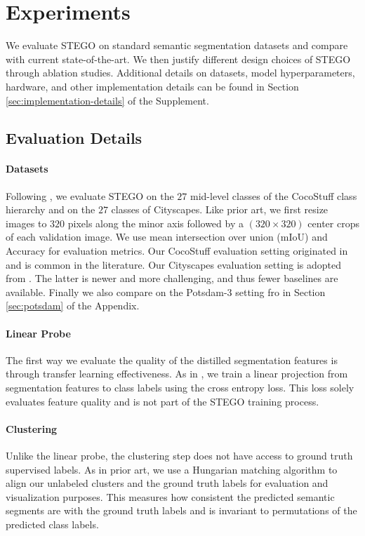 \documentclass{article} \usepackage{iclr2022_conference,times}
\begin{document}
\section{Experiments}
\vspace{-.1in}

We evaluate STEGO on standard semantic segmentation datasets and compare with current state-of-the-art. We then justify different design choices of STEGO through ablation studies. Additional details on datasets, model hyperparameters, hardware, and other implementation details can be found in Section \ref{sec:implementation-details} of the Supplement.

\subsection{Evaluation Details}
\label{sec:evaluation}
\vspace{-.1in}
\paragraph{Datasets}
Following \cite{Cho2021PiCIEUS}, we evaluate STEGO on the $27$ mid-level classes of the CocoStuff class hierarchy and on the $27$ classes of Cityscapes. Like prior art, we first resize images to $320$ pixels along the minor axis followed by a $(320 \times 320)$ center crops of each validation image. We use mean intersection over union (mIoU) and Accuracy for evaluation metrics. Our CocoStuff evaluation setting originated in \cite{iic} and is common in the literature. Our Cityscapes evaluation setting is adopted from \cite{Cho2021PiCIEUS}. The latter is newer and more challenging, and thus fewer baselines are available. Finally we also compare on the Potsdam-3 setting fro \cite{iic} in Section \ref{sec:potsdam} of the Appendix.
\vspace{-.1in}
\paragraph{Linear Probe} The first way we evaluate the quality of the distilled segmentation features is through transfer learning effectiveness. As in \cite{maskcontrast,Cho2021PiCIEUS,chen2020improved}, we train a linear projection from segmentation features to class labels using the cross entropy loss. This loss solely evaluates feature quality and is not part of the STEGO training process.
\vspace{-.3in}
\paragraph{Clustering} Unlike the linear probe, the clustering step does not have access to ground truth supervised labels. As in prior art, we use a Hungarian matching algorithm to align our unlabeled clusters and the ground truth labels for evaluation and visualization purposes. This measures how consistent the predicted semantic segments are with the ground truth labels and is invariant to permutations of the predicted class labels.
\end{document}
